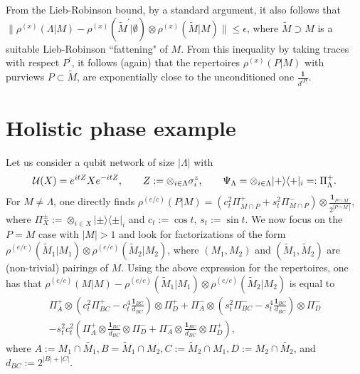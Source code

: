 \documentclass[aps,pra,groupaddress]{revtex4-1}
\begin{document}
From the Lieb-Robinson bound, by a standard argument, it also follows
that 
$\|\rho^{(x)}(\Lambda|M)- \rho^{(x)}(\tilde{M}^\prime|\emptyset)\otimes  \rho^{(x)}(\tilde{M}|M)\|\le \epsilon$,
where $\tilde{M} \supset M$ is a suitable Lieb-Robinson ``fattening"
of $M$.
From this inequality by taking traces with respect $P^\prime$, it
follows (again) that the repertoires $\rho^{(x)}(P|M)$ with purviews
$P\subset \tilde{M}$, are exponentially close to the unconditioned one
$\frac{\mathbf{1}}{d^{|P|}}$.
\section{Holistic phase example}
\label{sec:sup3}

Let us consider a qubit network of size $|\Lambda|$ with 
\begin{equation}
{\cal U}(X)=e^{itZ}Xe^{-itZ},\qquad Z:=\otimes_{i\in\Lambda}\sigma_i^z,\qquad \Psi_\Lambda= \otimes_{i\in\Lambda}|+\rangle\langle +|_i=:\Pi^{+}_\Lambda.
\end{equation}
For $M \neq \Lambda$, one directly finds
$\rho^{(e/c)}(P|M)= (c_t^2  \Pi^{+}_{M\cap P} +s_t^2 \Pi^{-}_{M\cap P})\otimes \frac{ {\mathbf{1}}_{P\cap M^\prime} } {2^{|P\cap M^\prime|} }$,
where $\Pi_X^{\pm}:=\otimes_{i\in X} |\pm\rangle\langle \pm|_i$
and $c_t:=\cos t,\,s_t:=\sin t$.
We now focus on the $P=M$ case with $|M|>1$ and look for
factorizations of the form
$\rho^{(e/c)}(\tilde{M}_1|M_1)\otimes \rho^{(e/c)}(\tilde{M}_2|M_2)$,
where $(M_1, M_2)$ and $(\tilde{M}_1, \tilde{M}_2)$ are (non-trivial)
pairings of $M$.
Using the above expression for the repertoires, one has that
$\rho^{(e/c)}(M|M)-\rho^{(e/c)}(\tilde{M}_1|M_1)\otimes \rho^{(e/c)}(\tilde{M}_2|M_2)$
is equal to
\begin{multline}
\Pi_{A}^+\otimes ( c_t^2   \Pi_{BC}^+- c_t^4  \frac{ {\mathbf{1}}_{BC} } {d_{BC} }   )\otimes \Pi_{D}^+
+\Pi_{A}^-\otimes ( s_t^2   \Pi_{BC}^-- s_t^4  \frac{ {\mathbf{1}}_{BC} } {d_{BC} }   )\otimes \Pi_{D}^- \\
-s_t^2c_t^2 (     \Pi_{A}^+\otimes\frac{ {\mathbf{1}}_{BC} } {d_{BC} }\otimes   \Pi_{D}^- + 
  \Pi_{A}^-\otimes\frac{ {\mathbf{1}}_{BC} } {d_{BC} }\otimes   \Pi_{D}^+),\nonumber
\end{multline}
where
$A:=M_1\cap \tilde{M_1}, B= \tilde{M}_1\cap {M_2}, C:= \tilde{M}_2\cap {M_1}, D:= M_2\cap \tilde{M_2}$,
and $d_{BC}:=2^{|B|+|C|}$.
\end{document}

